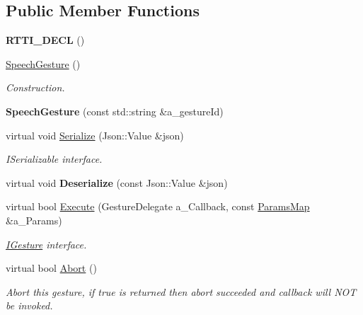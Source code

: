 \subsection*{Public Member Functions}
\begin{DoxyCompactItemize}
\item 
\mbox{\label{class_speech_gesture_a7a64c6958da22c1eaa2f6793f1618358}} 
{\bfseries R\+T\+T\+I\+\_\+\+D\+E\+CL} ()
\item 
\mbox{\label{class_speech_gesture_ad5da1d2262be9d30e2fe32fdd9972b3a}} 
\hyperlink{class_speech_gesture_ad5da1d2262be9d30e2fe32fdd9972b3a}{Speech\+Gesture} ()
\begin{DoxyCompactList}\small\item\em Construction. \end{DoxyCompactList}\item 
\mbox{\label{class_speech_gesture_a11e7ca92445c22479429a470d2e1395d}} 
{\bfseries Speech\+Gesture} (const std\+::string \&a\+\_\+gesture\+Id)
\item 
\mbox{\label{class_speech_gesture_a329ce19bebb4dbfc026e2670c074df41}} 
virtual void \hyperlink{class_speech_gesture_a329ce19bebb4dbfc026e2670c074df41}{Serialize} (Json\+::\+Value \&json)
\begin{DoxyCompactList}\small\item\em I\+Serializable interface. \end{DoxyCompactList}\item 
\mbox{\label{class_speech_gesture_a733c84aeee76f7f4ffc9de241183c14b}} 
virtual void {\bfseries Deserialize} (const Json\+::\+Value \&json)
\item 
\mbox{\label{class_speech_gesture_a353c573afdea4713e12e88de207b67ec}} 
virtual bool \hyperlink{class_speech_gesture_a353c573afdea4713e12e88de207b67ec}{Execute} (Gesture\+Delegate a\+\_\+\+Callback, const \hyperlink{class_params_map}{Params\+Map} \&a\+\_\+\+Params)
\begin{DoxyCompactList}\small\item\em \hyperlink{class_i_gesture}{I\+Gesture} interface. \end{DoxyCompactList}\item 
\mbox{\label{class_speech_gesture_acf657cf5f390755653e18e9f7819ecb3}} 
virtual bool \hyperlink{class_speech_gesture_acf657cf5f390755653e18e9f7819ecb3}{Abort} ()
\begin{DoxyCompactList}\small\item\em Abort this gesture, if true is returned then abort succeeded and callback will N\+OT be invoked. \end{DoxyCompactList}\end{DoxyCompactItemize}
